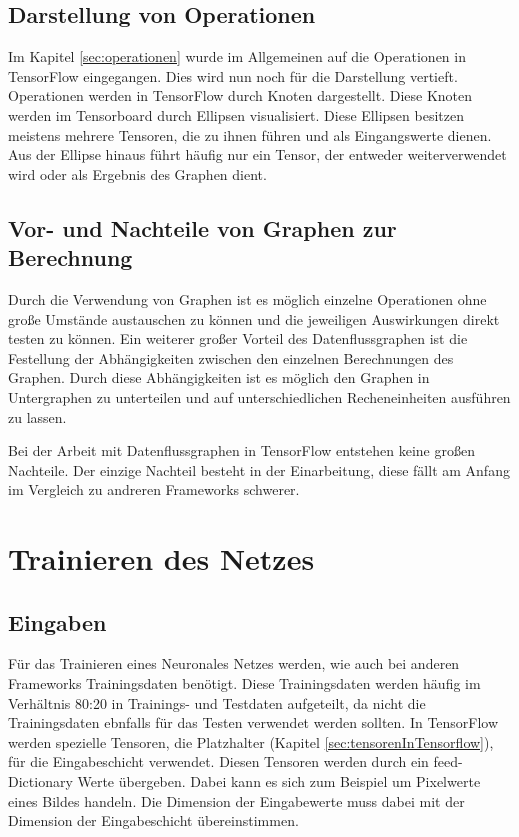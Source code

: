 \subsection{Darstellung von Operationen}
\label{sec:darstellungOperationen}
Im Kapitel \ref{sec:operationen} wurde im Allgemeinen auf die Operationen in TensorFlow eingegangen. Dies wird nun noch für die Darstellung vertieft. Operationen werden in TensorFlow durch Knoten dargestellt. Diese Knoten werden im Tensorboard durch Ellipsen visualisiert. Diese Ellipsen besitzen meistens mehrere Tensoren, die zu ihnen führen und als Eingangswerte dienen. Aus der Ellipse hinaus führt häufig nur ein Tensor, der entweder weiterverwendet wird oder als Ergebnis des Graphen dient. 


\subsection{Vor- und Nachteile von Graphen zur Berechnung}
\label{sec:vorUndNachteile}
Durch die Verwendung von Graphen ist es möglich einzelne Operationen ohne große Umstände austauschen zu können und die jeweiligen Auswirkungen direkt testen zu können. Ein weiterer großer Vorteil des Datenflussgraphen ist die Festellung der Abhängigkeiten zwischen den einzelnen Berechnungen des Graphen. Durch diese Abhängigkeiten ist es möglich den Graphen in Untergraphen zu unterteilen und auf unterschiedlichen Recheneinheiten ausführen zu lassen. 

Bei der Arbeit mit Datenflussgraphen in TensorFlow entstehen keine großen Nachteile. Der einzige Nachteil besteht in der Einarbeitung, diese fällt am Anfang im Vergleich zu andreren Frameworks schwerer.

\section{Trainieren des Netzes}
\label{sec:trainierenDesNetzes}
\printsubchapterauthor{\authorNiklas}
\subsection{Eingaben}
\label{sec:eingaben}
Für das Trainieren eines Neuronales Netzes werden, wie auch bei anderen Frameworks Trainingsdaten benötigt. Diese Trainingsdaten werden häufig im Verhältnis 80:20 in Trainings- und Testdaten aufgeteilt, da nicht die Trainingsdaten ebnfalls für das Testen verwendet werden sollten. In TensorFlow werden spezielle Tensoren, die Platzhalter (Kapitel \ref{sec:tensorenInTensorflow}), für die Eingabeschicht verwendet. Diesen Tensoren werden durch ein feed-Dictionary Werte übergeben. Dabei kann es sich zum Beispiel um Pixelwerte eines Bildes handeln. Die Dimension der Eingabewerte muss dabei mit der Dimension der Eingabeschicht übereinstimmen. 

